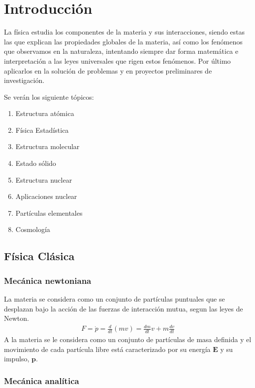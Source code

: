 \documentclass[../main]{subfiles}
\begin{document}
\chapter{Introducción}

La física estudia los componentes de la materia y sus interacciones, siendo estas las que explican las propiedades globales de la materia, así como los fenómenos que observamos en la naturaleza, intentando siempre dar forma matemática e interpretación a las leyes universales que rigen estos fenómenos. Por último aplicarlos en la solución de problemas y en proyectos preliminares de investigación.

Se verán los siguiente tópicos:

\begin{enumerate}
  \item Estructura atómica
  \item Física Estadística
  \item Estructura molecular
  \item Estado sólido
  \item Estructura nuclear
  \item Aplicaciones nuclear
  \item Partículas elementales
  \item Cosmología
\end{enumerate}

\section{Física Clásica}

\subsection{Mecánica newtoniana}

La materia se considera como un conjunto de partículas puntuales que se desplazan bajo la acción de las fuerzas de interacción mutua, segun las leyes de Newton.
\begin{align}
    F=\dot{p}=\frac{d}{dt}\left(mv\right)=\frac{dm}{dt}v+m\frac{dv}{dt}
\end{align}
A la materia se le considera como un conjunto de partículas de masa definida y el movimiento de cada partícula libre está caracterizado por su energía $\boldsymbol E$ y su impulso, $\boldsymbol p$.

\subsection{Mecánica analítica}
\end{document}
